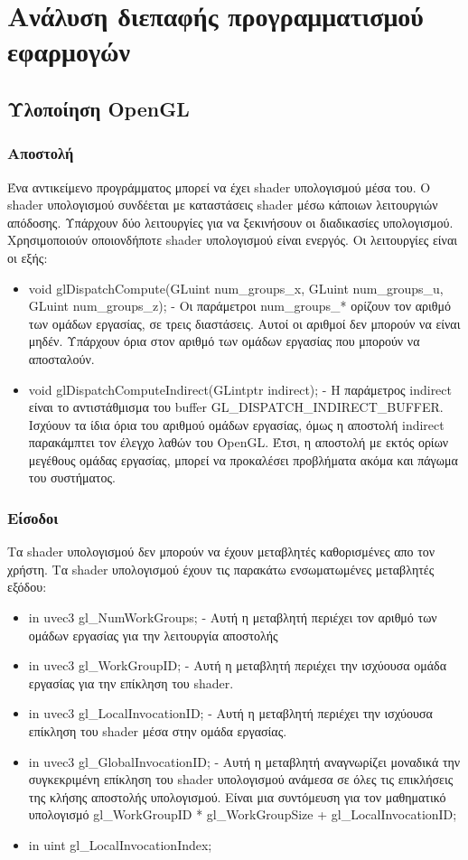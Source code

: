 \section{Ανάλυση διεπαφής προγραμματισμού εφαρμογών}
\subsection{Υλοποίηση OpenGL}
\subsubsection{Αποστολή}
Ένα αντικείμενο προγράμματος μπορεί να έχει shader υπολογισμού μέσα του. Ο shader υπολογισμού συνδέεται με καταστάσεις shader μέσω κάποιων λειτουργιών απόδοσης. Υπάρχουν δύο λειτουργίες για να ξεκινήσουν οι διαδικασίες υπολογισμού. Χρησιμοποιούν οποιονδήποτε shader υπολογισμού είναι ενεργός. Οι λειτουργίες είναι οι εξής:
\begin{itemize}
\item void glDispatchCompute(GLuint num\_groups\_x, GLuint num\_groups\_u, GLuint num\_groups\_z); - Οι παράμετροι num\_groups\_* ορίζουν τον αριθμό των ομάδων εργασίας, σε τρεις διαστάσεις. Αυτοί οι αριθμοί δεν μπορούν να είναι μηδέν. Υπάρχουν όρια στον αριθμό των ομάδων εργασίας που μπορούν να αποσταλούν.
\item void glDispatchComputeIndirect(GLintptr indirect); - H παράμετρος indirect είναι το αντιστάθμισμα του buffer GL\_DISPATCH\_INDIRECT\_BUFFER. Ισχύουν τα ίδια όρια του αριθμού ομάδων εργασίας, όμως η αποστολή indirect παρακάμπτει τον έλεγχο λαθών του OpenGL. Έτσι, η αποστολή με εκτός ορίων μεγέθους ομάδας εργασίας, μπορεί να προκαλέσει προβλήματα ακόμα και πάγωμα του συστήματος.
\end{itemize}
\subsubsection{Είσοδοι}
Τα shader υπολογισμού  δεν μπορούν να έχουν μεταβλητές καθορισμένες απο τον χρήστη. Τα shader υπολογισμού έχουν τις παρακάτω ενσωματωμένες μεταβλητές εξόδου:
\begin{itemize}
\item in uvec3 gl\_NumWorkGroups; - Αυτή η μεταβλητή περιέχει τον αριθμό των ομάδων εργασίας για την λειτουργία αποστολής
\item in uvec3 gl\_WorkGroupID; - Αυτή η μεταβλητή περιέχει την ισχύουσα ομάδα εργασίας για την επίκληση του shader.
\item in uvec3 gl\_LocalInvocationID; - Αυτή η μεταβλητή περιέχει την ισχύουσα επίκληση του shader μέσα στην ομάδα εργασίας.
\item in uvec3 gl\_GlobalInvocationID; - Αυτή η μεταβλητή αναγνωρίζει μοναδικά την συγκεκριμένη επίκληση του shader υπολογισμού  ανάμεσα σε όλες τις επικλήσεις της κλήσης αποστολής υπολογισμού. Είναι μια συντόμευση για τον μαθηματικό υπολογισμό gl\_WorkGroupID * gl\_WorkGroupSize + gl\_LocalInvocationID;
\item in uint  gl\_LocalInvocationIndex;
\end{itemize}
